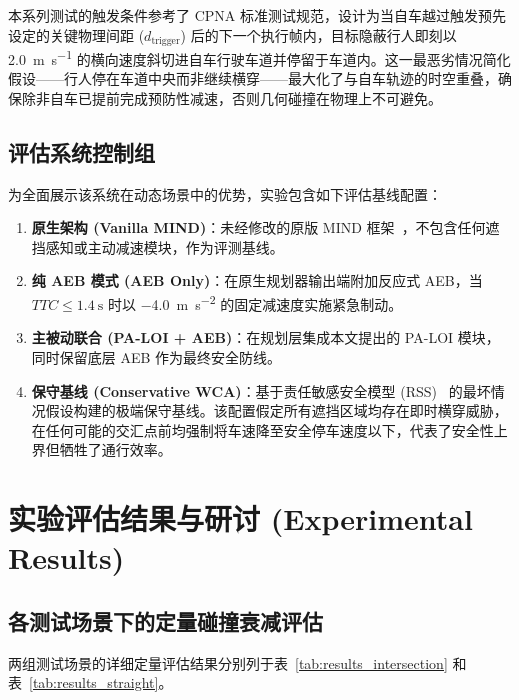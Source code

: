 \documentclass[conference]{IEEEtran}
\begin{document}
本系列测试的触发条件参考了 CPNA 标准测试规范，设计为当自车越过触发预先设定的关键物理间距 ($d_{\text{trigger}}$) 后的下一个执行帧内，目标隐蔽行人即刻以 \SI{2.0}{\meter\per\second} 的横向速度斜切进自车行驶车道并停留于车道内。这一最恶劣情况简化假设——行人停在车道中央而非继续横穿——最大化了与自车轨迹的时空重叠，确保除非自车已提前完成预防性减速，否则几何碰撞在物理上不可避免。

\subsection{评估系统控制组}
为全面展示该系统在动态场景中的优势，实验包含如下评估基线配置：
\begin{enumerate}
    \item \textbf{原生架构 (Vanilla MIND)}：未经修改的原版 MIND 框架~\cite{mind2025}，不包含任何遮挡感知或主动减速模块，作为评测基线。
    \item \textbf{纯 AEB 模式 (AEB Only)}：在原生规划器输出端附加反应式 AEB，当 $TTC \leq \SI{1.4}{\second}$ 时以 \SI{-4.0}{\meter\per\second\squared} 的固定减速度实施紧急制动。
    \item \textbf{主被动联合 (PA-LOI + AEB)}：在规划层集成本文提出的 PA-LOI 模块，同时保留底层 AEB 作为最终安全防线。
    \item \textbf{保守基线 (Conservative WCA)}：基于责任敏感安全模型 (RSS)~\cite{shalev2017rss} 的最坏情况假设构建的极端保守基线。该配置假定所有遮挡区域均存在即时横穿威胁，在任何可能的交汇点前均强制将车速降至安全停车速度以下，代表了安全性上界但牺牲了通行效率。
\end{enumerate}

\section{实验评估结果与研讨 (Experimental Results)}

\subsection{各测试场景下的定量碰撞衰减评估}
两组测试场景的详细定量评估结果分别列于表~\ref{tab:results_intersection} 和表~\ref{tab:results_straight}。
\end{document}
